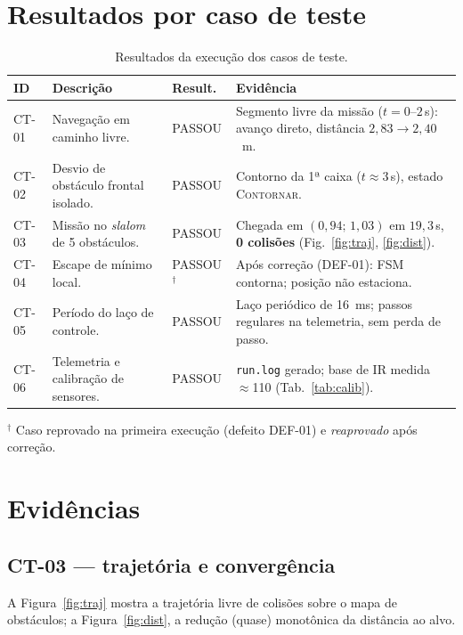 \section{Resultados por caso de teste}
\begin{table}[H]\centering
\caption{Resultados da execução dos casos de teste.}
\renewcommand{\arraystretch}{1.25}
\begin{tabularx}{\textwidth}{@{}l X l X@{}}
\toprule
\textbf{ID} & \textbf{Descrição} & \textbf{Result.} & \textbf{Evidência} \\
\midrule
CT-01 & Navegação em caminho livre. & PASSOU & Segmento livre da missão ($t=0$--$2$\,s): avanço direto, distância $2{,}83\to2{,}40$~m. \\
CT-02 & Desvio de obstáculo frontal isolado. & PASSOU & Contorno da 1ª caixa ($t\approx3$\,s), estado \textsc{Contornar}. \\
CT-03 & Missão no \emph{slalom} de 5 obstáculos. & PASSOU & Chegada em $(0{,}94;\,1{,}03)$ em $19{,}3$\,s, \textbf{0 colisões} (Fig.~\ref{fig:traj}, \ref{fig:dist}). \\
CT-04 & Escape de mínimo local. & PASSOU$^\dagger$ & Após correção (DEF-01): FSM contorna; posição não estaciona. \\
CT-05 & Período do laço de controle. & PASSOU & Laço periódico de 16~ms; passos regulares na telemetria, sem perda de passo. \\
CT-06 & Telemetria e calibração de sensores. & PASSOU & \texttt{run.log} gerado; base de IR medida $\approx$110 (Tab.~\ref{tab:calib}). \\
\bottomrule
\end{tabularx}
\end{table}
\footnotesize $^\dagger$ Caso reprovado na primeira execução (defeito DEF-01) e \emph{reaprovado} após correção. \normalsize

\section{Evidências}
\subsection{CT-03 --- trajetória e convergência}
A Figura~\ref{fig:traj} mostra a trajetória livre de colisões sobre o mapa de obstáculos; a Figura~\ref{fig:dist}, a redução (quase) monotônica da distância ao alvo.

